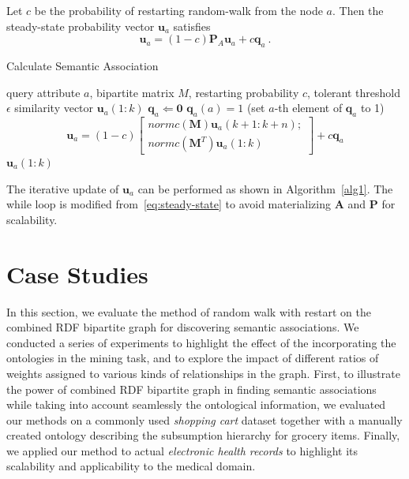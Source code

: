 Let $c$ be the probability of restarting random-walk from the node $a$. Then the steady-state probability vector $\mathbf{u}_a$ satisfies
\begin{equation}
\label{eq:steady-state}
\mathbf{u}_a=(1-c)\mathbf{P}_A\mathbf{u}_a+c\mathbf{q}_a~.
\end{equation}

\renewcommand{\algorithmicrequire}{\textbf{Input:}}
\renewcommand{\algorithmicensure}{\textbf{Output:}}
\begin{algorithm}
\caption{Calculate Semantic Association}
\label{alg1}
\begin{algorithmic}
\REQUIRE query attribute $a$, bipartite matrix $M$, restarting probability $c$, tolerant threshold $\epsilon$
\ENSURE similarity vector $\mathbf{u}_a(1:k)$
\STATE $\mathbf{q}_a \Leftarrow \mathbf{0}$
\STATE $\mathbf{q}_a(a)=1$ (set $a$-th element of $\mathbf{q}_a$ to 1)
\STATE \[
    \mathbf{u}_a = (1-c)  \left[ \begin{array}{c}
        normc(\mathbf{M})\mathbf{u}_a(k+1:k+n);\\
        normc(\mathbf{M}^T)\mathbf{u}_a(1:k)
    \end{array} \right] + c\mathbf{q}_a
\]
\ENDWHILE
\RETURN $\mathbf{u}_a(1:k)$
\end{algorithmic}
\end{algorithm}

The iterative update of $\mathbf{u}_a$ can be performed as shown in Algorithm~\ref{alg1}. The while loop is modified from~\ref{eq:steady-state} to avoid materializing $\mathbf{A}$ and $\mathbf{P}$ for scalability.


\section{Case Studies}
In this section, we evaluate the method of random walk with restart on the combined RDF bipartite graph for discovering semantic associations. We conducted a series of experiments to highlight the effect of the incorporating the ontologies in the mining task, and to explore the impact of different ratios of weights assigned to various kinds of relationships in the graph. First, to illustrate the power of combined RDF bipartite graph in finding semantic associations while taking into account seamlessly the ontological information, we evaluated our methods on a commonly used \emph{shopping cart} dataset together with a manually created ontology describing the subsumption hierarchy for grocery items.  Finally, we applied our method to actual \emph{electronic health records} to highlight its scalability and applicability to the medical domain.

